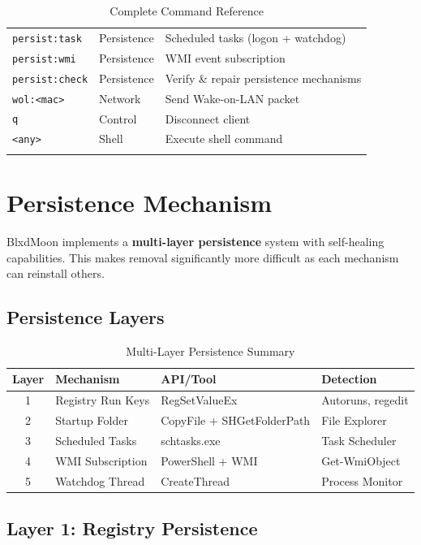 \documentclass[12pt,a4paper]{article}
\begin{document}
\begin{longtable}{llp{5cm}}
\texttt{persist:task} & Persistence & Scheduled tasks (logon + watchdog) \\
\texttt{persist:wmi} & Persistence & WMI event subscription \\
\texttt{persist:check} & Persistence & Verify \& repair persistence mechanisms \\
\texttt{wol:<mac>} & Network & Send Wake-on-LAN packet \\
\texttt{q} & Control & Disconnect client \\
\texttt{<any>} & Shell & Execute shell command \\
\bottomrule
\caption{Complete Command Reference}
\end{longtable}

\newpage
\section{Persistence Mechanism}

BlxdMoon implements a \textbf{multi-layer persistence} system with self-healing capabilities. This makes removal significantly more difficult as each mechanism can reinstall others.

\subsection{Persistence Layers}

\begin{table}[H]
\centering
\begin{tabular}{clll}
\toprule
\textbf{Layer} & \textbf{Mechanism} & \textbf{API/Tool} & \textbf{Detection} \\
\midrule
1 & Registry Run Keys & RegSetValueEx & Autoruns, regedit \\
2 & Startup Folder & CopyFile + SHGetFolderPath & File Explorer \\
3 & Scheduled Tasks & schtasks.exe & Task Scheduler \\
4 & WMI Subscription & PowerShell + WMI & Get-WmiObject \\
5 & Watchdog Thread & CreateThread & Process Monitor \\
\bottomrule
\end{tabular}
\caption{Multi-Layer Persistence Summary}
\end{table}

\subsection{Layer 1: Registry Persistence}
\end{document}
